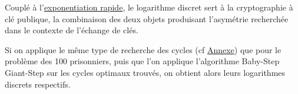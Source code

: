 Couplé à l'\href{https://fr.wikipedia.org/wiki/Exponentiation_rapide}{exponentiation rapide}, le logarithme discret sert à la cryptographie à clé publique,
la combinaison des deux objets produisant l'asymétrie recherchée dans le contexte de l'échange de clés.

Si on applique le même type de recherche des cycles (cf \href{https://github.com/YanisLcn/100-prisoners/blob/master/tools/permutation_cycles.py}{Annexe}) que pour le problème des 100 prisonniers,
puis que l'on applique l'algorithme Baby-Step Giant-Step sur les cycles optimaux trouvés, on obtient
alors leurs logarithmes discrets respectifs.